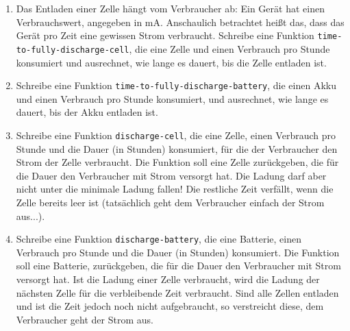 \begin{aufgabe}
\begin{enumerate}
  \item Das Entladen einer Zelle hängt vom Verbraucher ab: Ein Gerät
    hat einen Verbrauchswert, angegeben in mA.  Anschaulich betrachtet
    heißt das, dass das Gerät pro Zeit eine gewissen Strom verbraucht.
    Schreibe eine Funktion \texttt{time-to-fully-discharge-cell},
    die eine Zelle und einen Verbrauch pro Stunde konsumiert und
    ausrechnet, wie lange es dauert, bis die Zelle entladen ist.

  \item Schreibe eine Funktion
    \texttt{time-to-fully-discharge-battery}, die einen Akku und einen
    Verbrauch pro Stunde konsumiert, und ausrechnet, wie lange es
    dauert, bis der Akku entladen ist.

  \item Schreibe eine Funktion \texttt{discharge-cell}, die eine
    Zelle, einen Verbrauch pro Stunde und die Dauer (in Stunden)
    konsumiert, für die der Verbraucher den Strom der Zelle
    verbraucht.  Die Funktion soll eine Zelle zurückgeben, die für die
    Dauer den Verbraucher mit Strom versorgt hat.  Die Ladung darf
    aber nicht unter die minimale Ladung fallen! Die restliche Zeit
    verfällt, wenn die Zelle bereits leer ist (tatsächlich geht dem
    Verbraucher einfach der Strom aus...).

  \item Schreibe eine Funktion \texttt{discharge-battery}, die
    eine Batterie, einen Verbrauch pro Stunde und die Dauer (in
    Stunden) konsumiert.  Die Funktion soll eine Batterie,
    zurückgeben, die für die Dauer den Verbraucher mit Strom versorgt
    hat.  Ist die Ladung einer Zelle verbraucht, wird die Ladung der
    nächsten Zelle für die verbleibende Zeit verbraucht.  Sind alle
    Zellen entladen und ist die Zeit jedoch noch nicht aufgebraucht,
    so verstreicht diese, dem Verbraucher geht der Strom aus.

  \end{enumerate}
  
\end{aufgabe}

